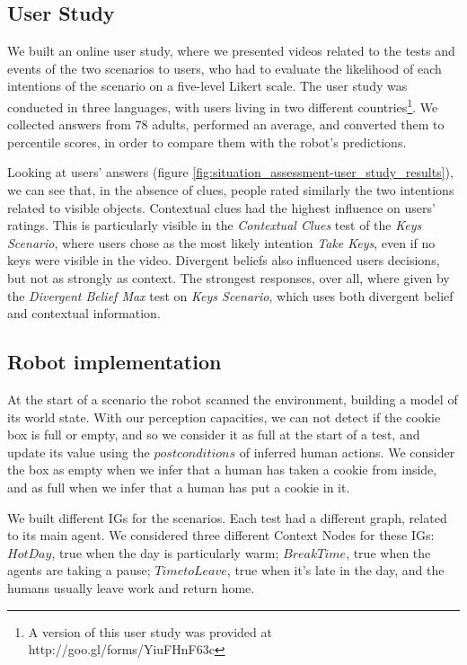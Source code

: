 \subsection{User Study}
We built an online user study, where we presented videos related to the tests and events of the two scenarios to users, who had to evaluate the likelihood of each intentions of the scenario
on a five-level Likert scale. The user study was conducted in three languages, with users living in two different countries\footnote{A version of this user study was provided at http://goo.gl/forms/YiuFHnF63c}. We collected answers from 78 adults, performed an average, and converted them to percentile scores, in order to compare them with the robot's predictions.

Looking at users' answers (figure \ref{fig:situation_assessment-user_study_results}), we can see that, in the absence of clues, people rated similarly the two intentions related to visible objects. Contextual clues had the highest influence on users' ratings. This is particularly visible in the \textit{Contextual Clues} test of the \textit{Keys Scenario}, where users chose as the most likely intention \textit{Take Keys}, even if no keys were visible in the video. Divergent beliefs also influenced users decisions, but not as strongly as context. The strongest responses, over all, where given by the \textit{Divergent Belief Max} test on \textit{Keys Scenario}, which uses both divergent belief and contextual information.

\subsection{Robot implementation}
At the start of a scenario the robot scanned the environment, building a model of its world state. With our perception capacities, we can not detect if the cookie box is full or empty, and so we consider it as full at the start of a test, and update its value using the $postconditions$ of inferred human actions. We consider the box as empty when we infer that a human has taken a cookie from inside, and as full when we infer that a human has put a cookie in it.

We built different IGs for the scenarios. Each test had a different graph, related to its main agent. We considered three different Context Nodes for these IGs: $Hot Day$, true when the day is particularly warm; $Break Time$, true when the agents are taking a pause; $Time to Leave$, true when it's late in the day, and the humans usually leave work and return home.

